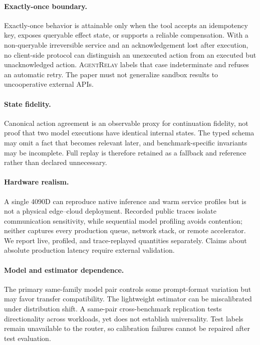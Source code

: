 \documentclass[10pt]{article}
\newcommand{\system}{\textsc{AgentRelay}}
\begin{document}
\paragraph{Exactly-once boundary.}
Exactly-once behavior is attainable only when the tool accepts an idempotency
key, exposes queryable effect state, or supports a reliable compensation.
With a non-queryable irreversible service and an acknowledgement lost after
execution, no client-side protocol can distinguish an unexecuted action from
an executed but unacknowledged action. \system{} labels that case
indeterminate and refuses an automatic retry. The paper must not generalize
sandbox results to uncooperative external APIs.

\paragraph{State fidelity.}
Canonical action agreement is an observable proxy for continuation fidelity,
not proof that two model executions have identical internal states. The typed
schema may omit a fact that becomes relevant later, and benchmark-specific
invariants may be incomplete. Full replay is therefore retained as a fallback
and reference rather than declared unnecessary.

\paragraph{Hardware realism.}
A single 4090D can reproduce native inference and warm service profiles but is
not a physical edge--cloud deployment. Recorded public traces isolate
communication sensitivity, while sequential model profiling avoids
contention; neither captures every production queue, network stack, or remote
accelerator. We report live, profiled, and trace-replayed quantities
separately. Claims about absolute production latency require external
validation.

\paragraph{Model and estimator dependence.}
The primary same-family model pair controls some prompt-format variation but
may favor transfer compatibility. The lightweight estimator can be
miscalibrated under distribution shift. A same-pair cross-benchmark replication
tests directionality across workloads, yet does not establish universality. Test labels remain
unavailable to the router, so calibration failures cannot be repaired after
test evaluation.
\end{document}
